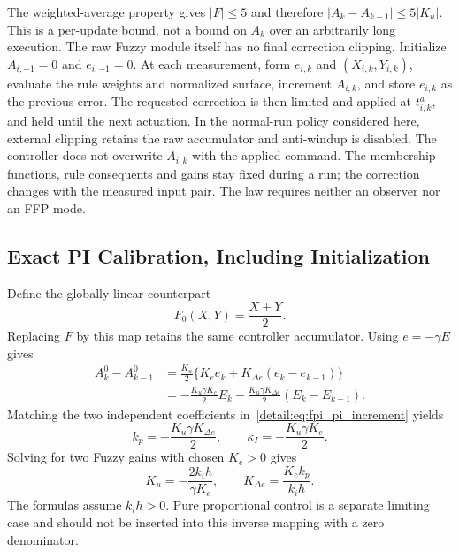 The weighted-average property gives $|F|\le5$ and therefore
$|A_k-A_{k-1}|\le5|K_u|$. This is a per-update bound, not a bound on $A_k$
over an arbitrarily long execution. The raw Fuzzy module itself has no
final correction clipping.
Initialize $A_{i,-1}=0$ and $e_{i,-1}=0$. At each measurement, form
$e_{i,k}$ and $(X_{i,k},Y_{i,k})$, evaluate the rule weights and normalized
surface, increment $A_{i,k}$, and store $e_{i,k}$ as the previous error.
The requested correction is then limited and applied at $t^a_{i,k}$, and
held until the next actuation. In the normal-run policy considered here,
external clipping retains the raw accumulator and anti-windup is disabled.
The controller does not overwrite $A_{i,k}$ with the applied command.
The membership functions, rule consequents and gains stay fixed during a
run; the correction changes with the measured input pair. The law requires
neither an observer nor an FFP mode.


\subsection{Exact PI Calibration, Including Initialization}
\label{detail:subsec:fpi_calibration}

Define the globally linear counterpart
\begin{equation}
 F_0(X,Y)=\frac{X+Y}{2}.
 \label{detail:eq:fpi_f0}
\end{equation}
Replacing $F$ by this map retains the same controller accumulator.
Using $e=-\gamma E$ gives
\begin{align}
 A^0_k-A^0_{k-1}
 &=\frac{K_u}{2}\{K_e e_k+K_{\Delta e}(e_k-e_{k-1})\}\\
 &=-\frac{K_u\gamma K_e}{2}E_k
   -\frac{K_u\gamma K_{\Delta e}}2(E_k-E_{k-1}).
 \label{detail:eq:fpi_substitution}
\end{align}
Matching the two independent coefficients in~\eqref{detail:eq:fpi_pi_increment}
yields
\begin{equation}
 k_p=-\frac{K_u\gamma K_{\Delta e}}2,\qquad
 \kappa_I=-\frac{K_u\gamma K_e}2.
 \label{detail:eq:fpi_matching}
\end{equation}
Solving for two Fuzzy gains with chosen $K_e>0$ gives
\begin{equation}
 K_u=-\frac{2k_ih}{\gamma K_e},\qquad
 K_{\Delta e}=\frac{K_ek_p}{k_ih}.
 \label{detail:eq:fpi_design_gains}
\end{equation}
The formulas assume $k_i h>0$. Pure proportional control is a separate
limiting case and should not be inserted into this inverse mapping with
a zero denominator.

